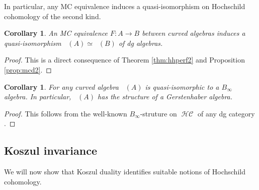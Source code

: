 \documentclass[a4paper]{amsart}
\theoremstyle{plain}
\newtheorem{cor}[thm]{Corollary}
\theoremstyle{definition}
\theoremstyle{remark}
\DeclareMathOperator{\HHc}{\mathcal{HC}}
\DeclareMathOperator{\HHII}{HH^{\mathrm{II}}}
\DeclareMathOperator{\HHIIc}{\mathcal{HC}^{\mathrm{II}}}%
\numberwithin{equation}{section}
\theoremstyle{plain}
\begin{document}
			In particular, any MC equivalence induces a quasi-isomorphism on Hochschild cohomology of the second kind. 
						\begin{cor}\label{C:mchh}
				An MC equivalence $F \colon A \to B$ between curved algebras induces a quasi-isomorphism $\HHIIc(A) \simeq \HHIIc(B)$ of dg algebras. 
			\end{cor}
			\begin{proof}
				This is a direct consequence of Theorem \ref{thm:hhperf2} and Proposition \ref{prop:mcd2}.
			\end{proof}
	\begin{cor}
		For any curved algebra	$\HHIIc(A)$ is quasi-isomorphic to a $B_\infty$ algebra. In particular, 
	$\HHII(A)$ has the structure of a Gerstenhaber algebra.
	\end{cor}
	\begin{proof}
		This follows from the well-known $B_\infty$-struture on $\HHc$ of any dg category \cite{kel06a}.
	\end{proof}


\subsection{Koszul invariance}\label{sect:koszulinvariance}
We will now show that Koszul duality identifies suitable notions of Hochschild cohomology. 
\end{document}
